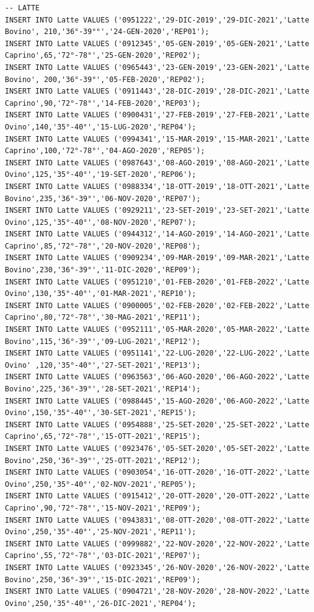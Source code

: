 \documentclass[12pt]{report}
\begin{document}
\begin{scriptsize}
\begin{verbatim}
-- LATTE
INSERT INTO Latte VALUES ('0951222','29-DIC-2019','29-DIC-2021','Latte Bovino', 210,'36°-39°°','24-GEN-2020','REP01');
INSERT INTO Latte VALUES ('0912345','05-GEN-2019','05-GEN-2021','Latte Caprino',65,'72°-78°','25-GEN-2020','REP02');
INSERT INTO Latte VALUES ('0965443','23-GEN-2019','23-GEN-2021','Latte Bovino', 200,'36°-39°','05-FEB-2020','REP02');
INSERT INTO Latte VALUES ('0911443','28-DIC-2019','28-DIC-2021','Latte Caprino',90,'72°-78°','14-FEB-2020','REP03');
INSERT INTO Latte VALUES ('0900431','27-FEB-2019','27-FEB-2021','Latte Ovino',140,'35°-40°','15-LUG-2020','REP04');
INSERT INTO Latte VALUES ('0994341','15-MAR-2019','15-MAR-2021','Latte Caprino',100,'72°-78°','04-AGO-2020','REP05');
INSERT INTO Latte VALUES ('0987643','08-AGO-2019','08-AGO-2021','Latte Ovino',125,'35°-40°','19-SET-2020','REP06');
INSERT INTO Latte VALUES ('0988334','18-OTT-2019','18-OTT-2021','Latte Bovino',235,'36°-39°','06-NOV-2020','REP07');
INSERT INTO Latte VALUES ('0929211','23-SET-2019','23-SET-2021','Latte Ovino',125,'35°-40°','08-NOV-2020','REP07');
INSERT INTO Latte VALUES ('0944312','14-AGO-2019','14-AGO-2021','Latte Caprino',85,'72°-78°','20-NOV-2020','REP08');
INSERT INTO Latte VALUES ('0909234','09-MAR-2019','09-MAR-2021','Latte Bovino',230,'36°-39°','11-DIC-2020','REP09');
INSERT INTO Latte VALUES ('0951210','01-FEB-2020','01-FEB-2022','Latte Ovino',130,'35°-40°','01-MAR-2021','REP10');
INSERT INTO Latte VALUES ('0900005','02-FEB-2020','02-FEB-2022','Latte Caprino',80,'72°-78°','30-MAG-2021','REP11');
INSERT INTO Latte VALUES ('0952111','05-MAR-2020','05-MAR-2022','Latte Bovino',115,'36°-39°','09-LUG-2021','REP12');
INSERT INTO Latte VALUES ('0951141','22-LUG-2020','22-LUG-2022','Latte Ovino' ,120,'35°-40°','27-SET-2021','REP13');
INSERT INTO Latte VALUES ('0963563','06-AGO-2020','06-AGO-2022','Latte Bovino',225,'36°-39°','28-SET-2021','REP14');
INSERT INTO Latte VALUES ('0988445','15-AGO-2020','06-AGO-2022','Latte Ovino',150,'35°-40°','30-SET-2021','REP15');
INSERT INTO Latte VALUES ('0954888','25-SET-2020','25-SET-2022','Latte Caprino',65,'72°-78°','15-OTT-2021','REP15');
INSERT INTO Latte VALUES ('0923476','05-SET-2020','05-SET-2022','Latte Bovino',250,'36°-39°','25-OTT-2021','REP12');
INSERT INTO Latte VALUES ('0903054','16-OTT-2020','16-OTT-2022','Latte Ovino',250,'35°-40°','02-NOV-2021','REP05');
INSERT INTO Latte VALUES ('0915412','20-OTT-2020','20-OTT-2022','Latte Caprino',90,'72°-78°','15-NOV-2021','REP09');
INSERT INTO Latte VALUES ('0943831','08-OTT-2020','08-OTT-2022','Latte Ovino',250,'35°-40°','25-NOV-2021','REP11');
INSERT INTO Latte VALUES ('0999882','22-NOV-2020','22-NOV-2022','Latte Caprino',55,'72°-78°','03-DIC-2021','REP07');
INSERT INTO Latte VALUES ('0923345','26-NOV-2020','26-NOV-2022','Latte Bovino',250,'36°-39°','15-DIC-2021','REP09');
INSERT INTO Latte VALUES ('0904721','28-NOV-2020','28-NOV-2022','Latte Ovino',250,'35°-40°','26-DIC-2021','REP04');


\end{verbatim}
\end{scriptsize}
\end{document}
